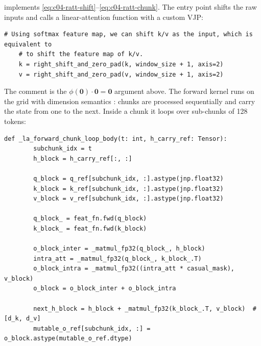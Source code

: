 \begin{implnote}[title={In the code: the Pallas kernels}]
implements \eqref{eq:c04-ratt-shift}--\eqref{eq:c04-ratt-chunk}. The entry point
 shifts the raw inputs and calls a linear-attention function with a
custom VJP:
\begin{lstlisting}[caption={Excerpt from \texttt{repos/\allowbreak{}apple\_\_axlearn/\allowbreak{}axlearn/\allowbreak{}common/\allowbreak{}rattention/\allowbreak{}kernels/\allowbreak{}linear\_attention\_kernels.py}},label={lst:c04-ratt-shiftcode}]
    # Using softmax feature map, we can shift k/v as the input, which is equivalent to
    # to shift the feature map of k/v.
    k = right_shift_and_zero_pad(k, window_size + 1, axis=2)
    v = right_shift_and_zero_pad(v, window_size + 1, axis=2)
\end{lstlisting}
The comment is the $\phi(\mathbf 0)\cdot\mathbf 0=\mathbf 0$ argument above. The forward kernel
runs on the grid  with dimension semantics
: chunks are processed sequentially and carry the state
from one to the next. Inside a chunk it loops over sub-chunks of 128 tokens:
\begin{lstlisting}[caption={Excerpt from \texttt{repos/\allowbreak{}apple\_\_axlearn/\allowbreak{}axlearn/\allowbreak{}common/\allowbreak{}rattention/\allowbreak{}kernels/\allowbreak{}linear\_attention\_kernels.py}},label={lst:c04-ratt-kernel}]
    def _la_forward_chunk_loop_body(t: int, h_carry_ref: Tensor):
        subchunk_idx = t
        h_block = h_carry_ref[:, :]

        q_block = q_ref[subchunk_idx, :].astype(jnp.float32)
        k_block = k_ref[subchunk_idx, :].astype(jnp.float32)
        v_block = v_ref[subchunk_idx, :].astype(jnp.float32)

        q_block_ = feat_fn.fwd(q_block)
        k_block_ = feat_fn.fwd(k_block)

        o_block_inter = _matmul_fp32(q_block_, h_block)
        intra_att = _matmul_fp32(q_block_, k_block_.T)
        o_block_intra = _matmul_fp32((intra_att * casual_mask), v_block)
        o_block = o_block_inter + o_block_intra

        next_h_block = h_block + _matmul_fp32(k_block_.T, v_block)  # [d_k, d_v]
        mutable_o_ref[subchunk_idx, :] = o_block.astype(mutable_o_ref.dtype)


\end{lstlisting}
\end{implnote}
